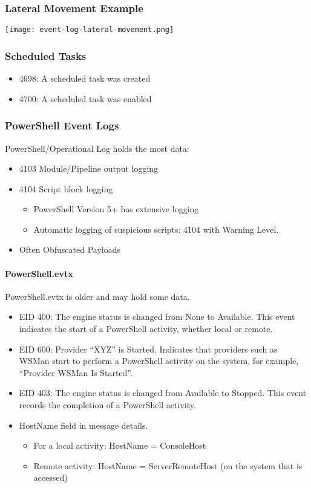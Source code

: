 \subsubsection{Lateral Movement Example}
\texttt{[image: event-log-lateral-movement.png]}

\subsubsection{Scheduled Tasks}
\begin{itemize}
  \item 4698: A scheduled task was created
  \item 4700: A scheduled task was enabled
\end{itemize}

\subsubsection{PowerShell Event Logs}
PowerShell/Operational Log holds the most data:
\begin{itemize}
  \item 4103 Module/Pipeline output logging
  \item 4104 Script block logging
  \begin{itemize}
    \item PowerShell Version 5+ has extensive logging
    \item Automatic logging of suspicious scripts: 4104 with Warning Level.
  \end{itemize}
  \item Often Obfuscated Payloads
\end{itemize}

\paragraph{PowerShell.evtx}
PowerShell.evtx is older and may hold some data.
\begin{itemize}
  \item EID 400: The engine status is changed from None to Available. This event indicates the start of a PowerShell activity, whether local or remote.
  \item EID 600: Provider ``XYZ'' is Started. Indicates that providers such as WSMan start to perform a PowerShell activity on the system, for example, “Provider WSMan Is Started”.
  \item EID 403: The engine status is changed from Available to Stopped. This event records the completion of a PowerShell activity.
  \item HostName field in message details. 
  \begin{itemize}
    \item For a local activity: HostName = ConsoleHost
    \item Remote activity: HostName = ServerRemoteHost (on the system that is accessed)
  \end{itemize}
\end{itemize}

